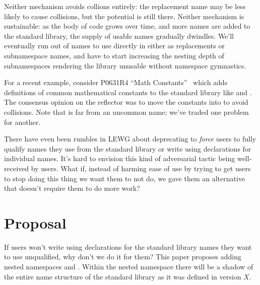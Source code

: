 Neither mechanism avoids collions entirely: the replacement name may be less
likely to cause collisions, but the potential is still there. Neither mechanism
is sustainable: as the body of \Cpp{} code grows over time, and more names are
added to the standard library, the supply of usable names gradually dwindles.
We'll eventually run out of names to use directly in  either as
replacements or subnamespace names, and have to start increasing the nesting
depth of subnamespaces rendering the library unusable without namespace
gymnastics.

For a recent example, consider P0631R4 ``Math Constants''~\cite{P0631R4} which
adds definitions of common mathematical constants to the standard library like
 and . The consensus opinion on the reflector was to move the
constants into  to avoid collisions. Note that  is
far from an uncommon name; we've traded one problem for another.

There have even been rumbles in LEWG about deprecating
 to \emph{force} users to fully qualify names they
use from the standard library or write using declarations for individual names.
It's hard to envision this kind of adversarial tactic being well-received by
users. What if, instead of harming ease of use by trying to get users to stop
doing this thing we want them to not do, we gave them an alternative that
doesn't require them to do more work?


\chapter{Proposal}
If users won't write using declarations for the standard library names they
want to use unqualified, why don't we do it for them? This paper proposes adding
nested namespaces  and . Within the
nested namespace  there will be a shadow of the entire name
structure of the standard library as it was defined in \Cpp{} version $X$.

